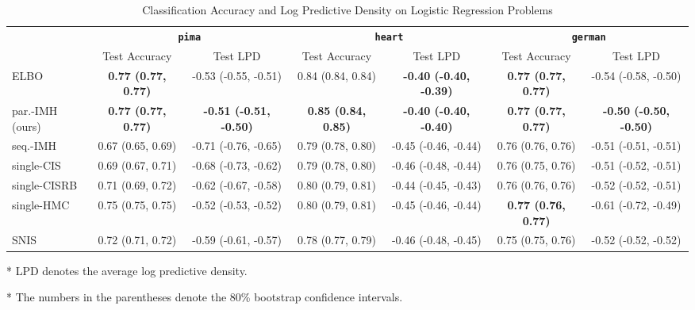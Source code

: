 
\begin{table*}
  \centering
  \caption{Classification Accuracy and Log Predictive Density on Logistic Regression Problems}\label{table:logistic}
  \setlength{\tabcolsep}{3pt}
  \begin{threeparttable}
  \begin{tabular}{lcccccc}
    \toprule
     & \multicolumn{2}{c}{\textbf{\texttt{pima}}} & \multicolumn{2}{c}{\textbf{\texttt{heart}}} & \multicolumn{2}{c}{\textbf{\texttt{german}}} \\
    \cmidrule(lr){2-3}\cmidrule(lr){4-5}\cmidrule(lr){6-7}
    & Test Accuracy & Test LPD
    & Test Accuracy & Test LPD
    & Test Accuracy & Test LPD \\\midrule
    ELBO & \textbf{0.77 {\scriptsize(0.77, 0.77)}} & -0.53 {\scriptsize(-0.55, -0.51)} & 0.84 {\scriptsize(0.84, 0.84)} & \textbf{-0.40 {\scriptsize(-0.40, -0.39)}} & \textbf{0.77 {\scriptsize(0.77, 0.77)}} & -0.54 {\scriptsize(-0.58, -0.50)}  \\\arrayrulecolor{black!30}\midrule
    par.-IMH (ours) & \textbf{0.77 {\scriptsize(0.77, 0.77)}} & \textbf{-0.51 {\scriptsize(-0.51, -0.50)}} & \textbf{0.85 {\scriptsize(0.84, 0.85)}} & \textbf{-0.40 {\scriptsize(-0.40, -0.40)}} & \textbf{0.77 {\scriptsize(0.77, 0.77)}} & \textbf{-0.50 {\scriptsize(-0.50, -0.50)}} \\
    seq.-IMH & 0.67 {\scriptsize(0.65, 0.69)} & -0.71 {\scriptsize(-0.76, -0.65)} & 0.79 {\scriptsize(0.78, 0.80)} & -0.45 {\scriptsize(-0.46, -0.44)} & 0.76 {\scriptsize(0.76, 0.76)} & -0.51 {\scriptsize(-0.51, -0.51)} \\
    single-CIS & 0.69 {\scriptsize(0.67, 0.71)} & -0.68 {\scriptsize(-0.73, -0.62)} & 0.79 {\scriptsize(0.78, 0.80)} & -0.46 {\scriptsize(-0.48, -0.44)} & 0.76 {\scriptsize(0.75, 0.76)} & -0.51 {\scriptsize(-0.52, -0.51)} \\
    single-CISRB & 0.71 {\scriptsize(0.69, 0.72)} & -0.62 {\scriptsize(-0.67, -0.58)} & 0.80 {\scriptsize(0.79, 0.81)} & -0.44 {\scriptsize(-0.45, -0.43)} & 0.76 {\scriptsize(0.76, 0.76)} & -0.52 {\scriptsize(-0.52, -0.51)} \\
    single-HMC & 0.75 {\scriptsize(0.75, 0.75)} & -0.52 {\scriptsize(-0.53, -0.52)} & 0.80 {\scriptsize(0.79, 0.81)} & -0.45 {\scriptsize(-0.46, -0.44)} & \textbf{0.77 {\scriptsize(0.76, 0.77)}} & -0.61 {\scriptsize(-0.72, -0.49)} \\
    SNIS & 0.72 {\scriptsize(0.71, 0.72)} & -0.59 {\scriptsize(-0.61, -0.57)} & 0.78 {\scriptsize(0.77, 0.79)} & -0.46 {\scriptsize(-0.48, -0.45)} & 0.75 {\scriptsize(0.75, 0.76)} & -0.52 {\scriptsize(-0.52, -0.52)} \\\bottomrule
  \end{tabular}
  \begin{tablenotes}
    \item[*]{\footnotesize LPD denotes the average log predictive density.}
    \item[*]{\footnotesize The numbers in the parentheses denote the 80\% bootstrap confidence intervals.}
  \end{tablenotes}
  \end{threeparttable}
\end{table*}


